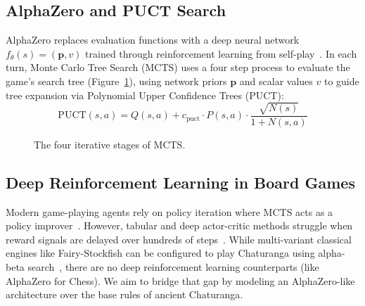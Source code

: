 \documentclass[11pt,a4paper,twocolumn]{article}
\begin{document}
\subsection{AlphaZero and PUCT Search}
AlphaZero replaces evaluation functions with a deep neural network $f_\theta(s) = (\mathbf{p}, v)$ trained through reinforcement learning from self-play~\cite{silver2018alphazero}. In each turn, Monte Carlo Tree Search (MCTS) uses a four step process to evaluate the game's search tree (Figure~\ref{fig:mcts_stages}), using network priors $\mathbf{p}$ and scalar values $v$ to guide tree expansion via Polynomial Upper Confidence Trees (PUCT):
\begin{equation}
\text{PUCT}(s, a) = Q(s, a) + c_{\text{puct}} \cdot P(s, a) \cdot \frac{\sqrt{N(s)}}{1 + N(s, a)}
\end{equation}

\begin{figure}[t]
\centering
{}
\caption{The four iterative stages of MCTS.}
\label{fig:mcts_stages}
\end{figure}

\subsection{Deep Reinforcement Learning in Board Games}
Modern game-playing agents rely on policy iteration where MCTS acts as a policy improver~\cite{silver2017alphago}. However, tabular and deep actor-critic methods struggle when reward signals are delayed over hundreds of steps~\cite{dash2026deeprl}. While multi-variant classical engines like Fairy-Stockfish can be configured to play Chaturanga using alpha-beta search~\cite{russell2021aima}, there are no deep reinforcement learning counterparts (like AlphaZero for Chess). We aim to bridge that gap by modeling an AlphaZero-like architecture over the base rules of ancient Chaturanga.
\end{document}
